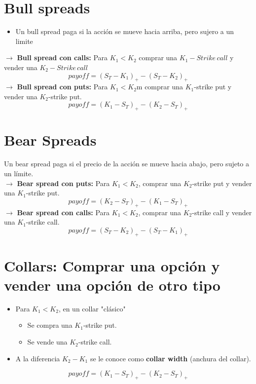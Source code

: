 \documentclass[12pts]{extarticle}
\begin{document}
\section{ Bull spreads} 
\begin{itemize} 
\item Un bull spread paga si la acción se mueve hacia arriba, pero sujero a un limite 
\end{itemize}
$\rightarrow$ \textbf{Bull spread con calls:} Para $K_1 < K_2$ comprar una $K_1-Strike \, call $ y vender una $K_2-Strike \, call$
$$payoff=(S_T-K_1)_+ -(S_T-K_2)_+$$
\newline 
\newline 
$\rightarrow$ \textbf{Bull spread con puts:} Para $K_1<K_2$m comprar una $K_1$-strike put y vender una $K_2$-strike put. 
$$payoff=(K_1-S_T)_+-(K_2-S_T)_+$$ 
\newline 
\section{Bear Spreads}
Un bear spread paga si el precio de la acción se mueve hacia abajo, pero sujeto a un límite. \\
$\rightarrow$ \textbf{Bear spread con puts:} Para $K_1<K_2$, comprar una $K_2$-strike put y vender una $K_1$-strike put.
$$payoff=(K_2-S_T)_+ - (K_1-S_T)_+$$
\newline 
$\rightarrow$ \textbf{Bear spread con calls:} Para $K_1<K_2$, comprar una $K_2$-strike call y vender una $K_1$-strike call. 
$$payoff=(S_T-K_2)_+-(S_T-K_1)_+$$


 

\section{Collars: Comprar una opción y vender una opción de otro tipo}
\begin{itemize}
\item Para $K_1<K_2$, en un collar "clásico" 
\begin{itemize}
\item Se compra una $K_1$-strike put.
\item Se vende una $K_2$-strike call. 
\end{itemize}
\item A la diferencia $K_2-K_1$ se le conoce como \textbf{collar width} (anchura del collar).
\end{itemize}
 $$payoff=(K_1-S_T)_+ - (K_2-S_T)_+$$
\end{document}
